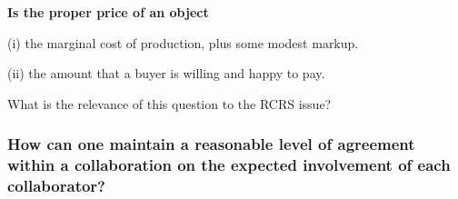 \documentclass[12pt]{beamer}
\begin{document}
\begin{frame}



\end{frame}
\begin{frame}



{\bf Is the proper price of an object 

(i) the marginal cost of production, plus some modest markup.

(ii) the amount that a buyer is willing and happy to pay.

What is the relevance of this question to the RCRS issue?
}


\end{frame}

\begin{frame} %

\frametitle{How can one maintain a reasonable level of agreement within a collaboration on the expected involvement of each collaborator?}



\end{frame}
\end{document}
